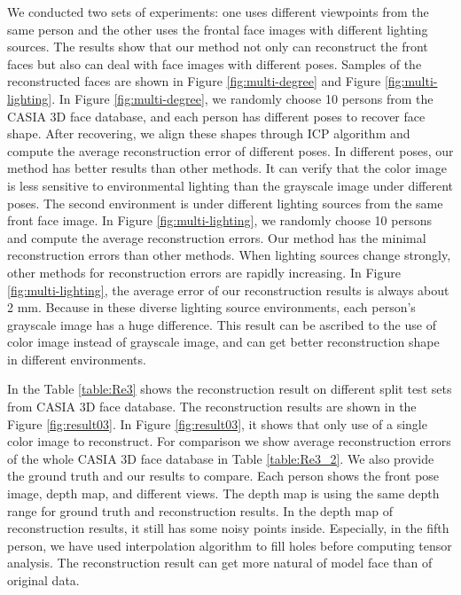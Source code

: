 We conducted two sets of experiments: one uses different viewpoints from the same person and the other uses the frontal face images with different lighting sources.
The results show that our method not only can reconstruct the front faces but also can deal with face images with different poses.
Samples of the reconstructed faces are shown in Figure \ref{fig:multi-degree} and Figure \ref{fig:multi-lighting}.
In Figure \ref{fig:multi-degree}, we randomly choose 10 persons from the CASIA 3D face database, and each person has different poses to recover face shape. 
After recovering, we align these shapes through ICP algorithm and compute the average reconstruction error of different poses. 
In different poses, our method has better results than other methods. It can verify that the color image is less sensitive to environmental lighting than the grayscale image under different poses. 
The second environment is under different lighting sources from the same front face image. 
In Figure \ref{fig:multi-lighting}, we randomly choose 10 persons and compute the average reconstruction errors. 
Our method has the minimal reconstruction errors than other methods.
When lighting sources change strongly, other methods for reconstruction errors are rapidly increasing.
In Figure \ref{fig:multi-lighting}, the average error of our reconstruction results is always about 2 mm. 
Because in these diverse lighting source environments, each person's grayscale image has a huge difference. 
This result can be ascribed to the use of color image instead of grayscale image, and can get better reconstruction shape in different environments.


In the Table \ref{table:Re3} shows the reconstruction result on different split test sets from CASIA 3D face database. 
The reconstruction results are shown in the Figure \ref{fig:result03}. 
In Figure \ref{fig:result03}, it shows that only use of a single color image to reconstruct. 
For comparison we show average reconstruction errors of the whole CASIA 3D face database in Table \ref{table:Re3_2}.
We also provide the ground truth and our results to compare. 
Each person shows the front pose image, depth map, and different views. 
The depth map is using the same depth range for ground truth and reconstruction results. 
In the depth map of reconstruction results, it still has some noisy points inside. 
Especially, in the fifth person, we have used interpolation algorithm to fill holes before computing tensor analysis. 
The reconstruction result can get more natural of model face than of original data. 



